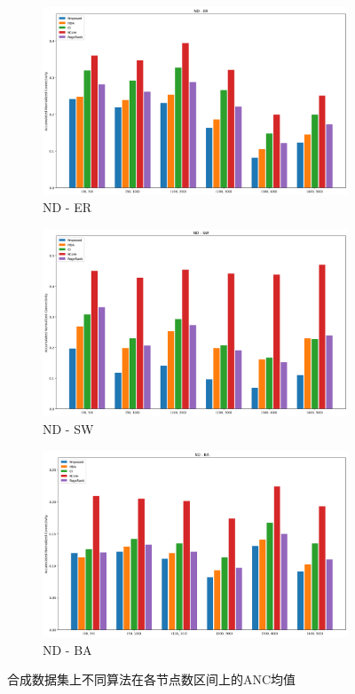 \begin{figure}[hptb]
    \medskip

    \begin{subfigure}{0.32\textwidth}
        \includegraphics[width=\linewidth]{ANC_ND_ER.png}
        \caption{ND - ER}
    \end{subfigure}%
    \hfill
    \begin{subfigure}{0.32\textwidth}
        \includegraphics[width=\linewidth]{ANC_ND_SW.png}
        \caption{ND - SW}
    \end{subfigure}%
    \hfill
    \begin{subfigure}{0.32\textwidth}
        \includegraphics[width=\linewidth]{ANC_ND_BA.png}
        \caption{ND - BA}
    \end{subfigure}%
    \caption{合成数据集上不同算法在各节点数区间上的ANC均值}
    \label{fig:合成数据集-ANCBar}
\end{figure}